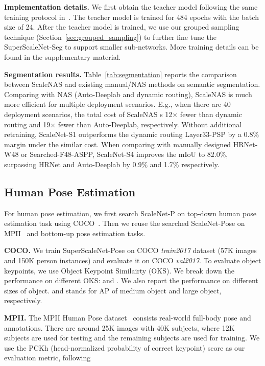 \documentclass[final]{cvpr}
\newcommand{\workname}{ScaleNAS\xspace}
\newcommand{\netname}{ScaleNet\xspace}
\newcommand{\supernet}{SuperScaleNet\xspace}
\begin{document}
\noindent\textbf{Implementation details.} We first obtain the teacher model following the same training protocol in~\cite{zhao2018psanet, wang2020deep}. 
The teacher model is trained for 484 epochs with the batch size of 24. 
After the teacher model is trained, we use our grouped sampling technique (Section~\ref{sec:grouped_sampling}) to further fine tune the \supernet-Seg to support smaller sub-networks. More training details can be found in the supplementary material.

\noindent\textbf{Segmentation results.} 
Table~\ref{tab:segmentation} reports the comparison between \workname and existing manual/NAS methods on semantic segmentation. Comparing with NAS (Auto-Deeplab and dynamic routing), \workname is much more efficient for multiple deployment scenarios. 
E.g., when there are 40 deployment scenarios, the total cost of \workname s 12× fewer than dynamic routing and 19× fewer than Auto-Deeplab, respectively. Without additional retraining, \netname-S1 outperforms the dynamic routing Layer33-PSP by a 0.8\% margin under the similar cost. When comparing with manually designed HRNet-W48 or Searched-F48-ASPP, \netname-S4 improves the mIoU to 82.0\%, surpassing HRNet and Auto-Deeplab by 0.9\% and 1.7\% respectively.


\subsection{Human Pose Estimation}
For human pose estimation, we first search \netname-P on top-down human pose estimation task using COCO~\cite{lin2014microsoft}. Then we reuse the searched \netname-Pose on MPII~\cite{andriluka20142d} and bottom-up pose estimation tasks.

\noindent\textbf{COCO.}
We train \supernet-Pose on COCO \textit{train2017} dataset (57K images and 150K person instances) and evaluate it on COCO \textit{val2017}. To evaluate object keypoints, we use Object Keypoint Similairty (OKS). We break down the performance on  different OKS:  and . We also report the performance on different sizes of object.  and  stands for AP of medium object and large object, respectively.

\noindent\textbf{MPII.}
The MPII Human Pose dataset~\cite{andriluka20142d} consists real-world full-body pose and annotations. There are around 25K images with 40K subjects, where 12K subjects are used for testing and the remaining subjects are used for training. We use the PCKh (head-normalized probability of correct keypoint) score as our evaluation metric, following~\cite{xiao2018simple, sun2019deep}
\end{document}
